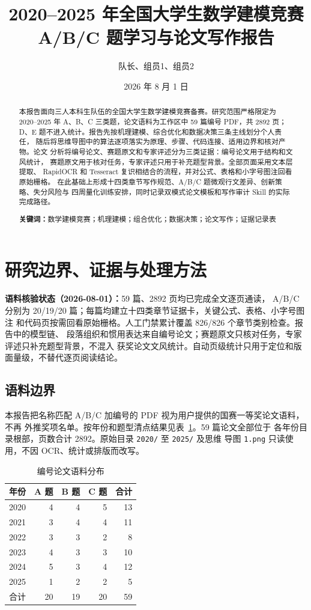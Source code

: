 \documentclass[UTF8,a4paper,12pt]{ctexart}
\title{\bfseries 2020--2025 年全国大学生数学建模竞赛\\A/B/C 题学习与论文写作报告}
\author{队长、组员1、组员2}
\date{2026 年 8 月 1 日}
\newcommand{\keywords}[1]{\par\noindent\textbf{关键词：}#1}
\begin{document}
\maketitle

\begin{abstract}
本报告面向三人本科生队伍的全国大学生数学建模竞赛备赛。研究范围严格限定为
2020--2025 年 A、B、C 三类题，论文语料为工作区中 59 篇编号 PDF，共 2892 页；
D、E 题不进入统计。报告先按机理建模、综合优化和数据决策三条主线划分个人责任，
随后将思维导图中的算法逐项落实为原理、步骤、代码连接、适用边界和核对产物。论文
分析将编号论文、赛题原文和专家评述分为三类证据：编号论文用于结构和文风统计，
赛题原文用于核对任务，专家评述只用于补充题型背景。全部页面采用文本层提取、
RapidOCR 和 Tesseract 复识相结合的流程，并对公式、表格和小字号图注回看原始栅格。
在此基础上形成十四类章节写作规范、A/B/C 题微观行文差异、创新策略、失分风险与
四周量化训练安排，同时记录双模式论文模板和写作审计 Skill 的实际完成路径。

\keywords{数学建模竞赛；机理建模；组合优化；数据决策；论文写作；证据记录表}
\end{abstract}

\tableofcontents
\newpage

\section{研究边界、证据与处理方法}

\noindent\textbf{语料核验状态（2026-08-01）：}59 篇、2892 页均已完成全文逐页通读，
A/B/C 分别为 20/19/20 篇；每篇均建立十四类章节证据卡，关键公式、表格、小字号图注
和代码页按需回看原始栅格。人工门禁累计覆盖 826/826 个章节类别检查。报告中的模型链、
段落组织和惯用表达来自编号论文；赛题原文只核对任务，专家评述只补充题型背景，不混入
获奖论文文风统计。自动页级统计只用于定位和版面量级，不替代逐页阅读结论。

\subsection{语料边界}

本报告把名称匹配 A/B/C 加编号的 PDF 视为用户提供的国赛一等奖论文语料，不再
外推奖项名单。按年份和题型清点结果见表~\ref{tab:corpus-count}。59 篇论文全部位于
各年份目录根部，页数合计 2892。原始目录 \texttt{2020/} 至 \texttt{2025/} 及思维
导图 \texttt{1.png} 只读使用，不因 OCR、统计或排版而改写。

\begin{table}[htbp]
\centering
\caption{编号论文语料分布}
\label{tab:corpus-count}
\begin{tabular}{crrrr}
\toprule
年份 & A 题 & B 题 & C 题 & 合计\\
\midrule
2020 & 4 & 4 & 5 & 13\\
2021 & 3 & 4 & 4 & 11\\
2022 & 3 & 3 & 2 & 8\\
2023 & 4 & 3 & 3 & 10\\
2024 & 5 & 3 & 4 & 12\\
2025 & 1 & 2 & 2 & 5\\
\midrule
合计 & 20 & 19 & 20 & 59\\
\bottomrule
\end{tabular}
\end{table}
\end{document}
